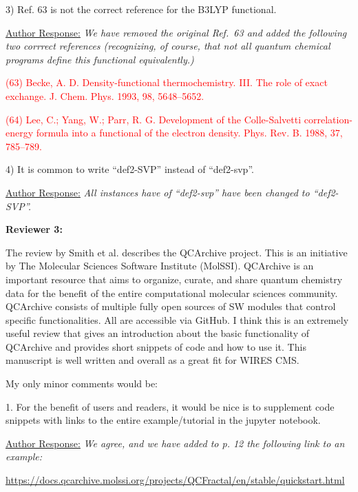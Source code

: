 \documentclass[12pt]{article}
\begin{document}
3) Ref. 63 is not the correct reference for the B3LYP functional. 

\noindent
\underline{Author Response:} \textit{We have removed the original Ref.\ 63 and
added the following two corrrect references (recognizing, of course, that not
all quantum chemical programs define this functional equivalently.)}

\noindent
\textcolor{red}{(63) Becke, A. D. Density-functional thermochemistry. III. The
role of exact exchange. J. Chem. Phys. 1993, 98, 5648–5652.}

\noindent
\textcolor{red}{(64) Lee, C.; Yang, W.; Parr, R. G. Development of the Colle-Salvetti
correlation-energy formula into a functional of the electron density. Phys. Rev.
B. 1988, 37, 785–789.}

4) It is common to write ``def2-SVP'' instead of ``def2-svp''.

\noindent \underline{Author Response:} \textit{All instances have of
``def2-svp'' have been changed to ``def2-SVP''.}

\noindent\makebox[\linewidth]{\rule{\linewidth}{0.4pt}}

\noindent
\textbf{Reviewer 3:}

\noindent The review by Smith et al. describes the QCArchive project. This is
an initiative by The Molecular Sciences Software Institute (MolSSI). QCArchive
is an important resource that aims to organize, curate, and share quantum
chemistry data for the benefit of the entire computational molecular sciences
community.  QCArchive consists of multiple fully open sources of SW modules
that control specific functionalities. All are accessible via GitHub. I think
this is an extremely useful review that gives an introduction about the basic
functionality of QCArchive and provides short snippets of code and how to use
it. This manuscript is well written and overall as a great fit for WIRES CMS.

My only minor comments would be:

1.	For the benefit of users and readers, it would be nice is to supplement code snippets with links to the entire example/tutorial in the jupyter notebook.

\noindent
\underline{Author Response:} \textit{We agree, and we have added to p. 12 the 
following link to an example:}

\begin{center}
\url{https://docs.qcarchive.molssi.org/projects/QCFractal/en/stable/quickstart.html}
\end{center}
\end{document}
